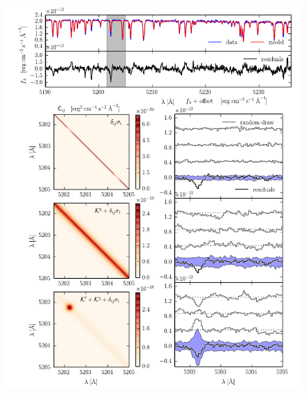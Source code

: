 \documentclass[iop,floatfix]{emulateapj}
\begin{document}
\begin{figure}[!htb]
\begin{center}
\includegraphics{figs/matrix_compilation.pdf}

\end{center}
\end{figure}
\end{document}
